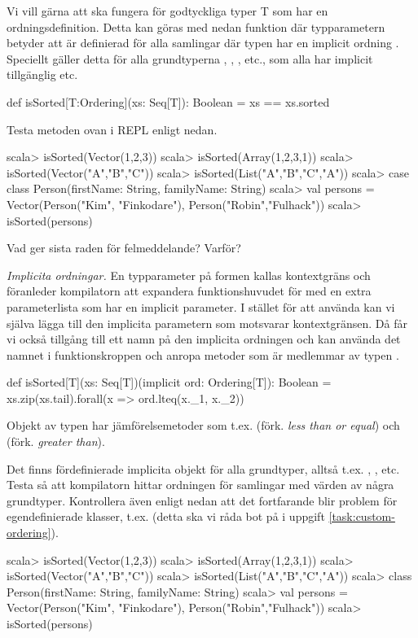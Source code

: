 \Subtask Vi vill gärna att  ska fungera för godtyckliga typer T som har en ordningsdefinition. Detta kan göras med nedan funktion där typparametern \code{[T:Ordering]} betyder att  är definierad för alla samlingar där typen  har en implicit ordning . Speciellt gäller detta för alla grundtyperna , , , etc., som alla har implicit tillgänglig  etc.
\begin{Code}
def isSorted[T:Ordering](xs: Seq[T]): Boolean = xs == xs.sorted
\end{Code}
Testa metoden ovan i REPL enligt nedan.
\begin{REPL}
scala> isSorted(Vector(1,2,3))
scala> isSorted(Array(1,2,3,1))
scala> isSorted(Vector("A","B","C"))
scala> isSorted(List("A","B","C","A"))
scala> case class Person(firstName: String, familyName: String)
scala> val persons = Vector(Person("Kim", "Finkodare"), Person("Robin","Fulhack"))
scala> isSorted(persons)
\end{REPL}
Vad ger sista raden för felmeddelande? Varför?


\Subtask \emph{Implicita ordningar.} En typparameter på formen \code{[T:Ordering]} kallas kontextgräns  och föranleder kompilatorn att expandera funktionshuvudet för  med en extra parameterlista som har en implicit parameter. I stället för att använda \code{[T:Ordering]} kan vi själva lägga till den implicita parametern som motsvarar kontextgränsen. Då får vi också tillgång till ett namn på den implicita ordningen och kan använda det namnet i funktionskroppen och anropa metoder som är medlemmar av typen .

\begin{CodeSmall}
def isSorted[T](xs: Seq[T])(implicit ord: Ordering[T]): Boolean =
  xs.zip(xs.tail).forall(x => ord.lteq(x._1, x._2))
\end{CodeSmall}

Objekt av typen  har jämförelsemetoder som t.ex.  (förk. \emph{less than or equal}) och  (förk. \emph{greater than}).

Det finns fördefinierade implicita objekt  för alla grundtyper, alltså t.ex. , , etc.
Testa så att kompilatorn hittar ordningen för samlingar med värden av några grundtyper. Kontrollera även enligt nedan att det fortfarande blir problem för egendefinierade klasser, t.ex.   (detta ska vi råda bot på i uppgift \ref{task:custom-ordering}).
\begin{REPL}
scala> isSorted(Vector(1,2,3))
scala> isSorted(Array(1,2,3,1))
scala> isSorted(Vector("A","B","C"))
scala> isSorted(List("A","B","C","A"))
scala> class Person(firstName: String, familyName: String)
scala> val persons = Vector(Person("Kim", "Finkodare"), Person("Robin","Fulhack"))
scala> isSorted(persons)
\end{REPL}

